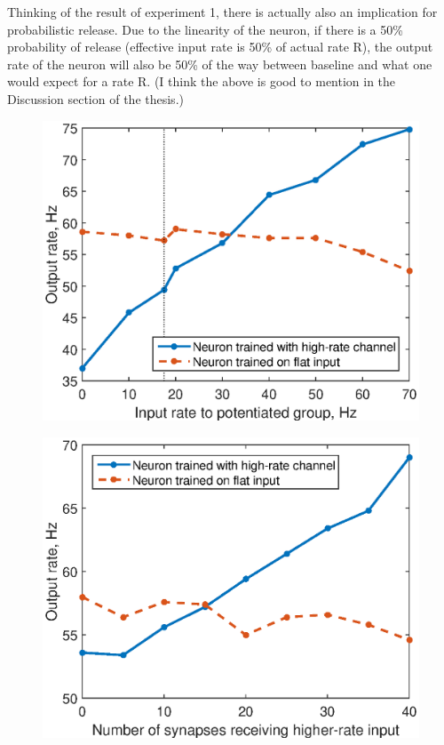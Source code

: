 \documentclass[a4paper,12pt]{report}
\theoremstyle{definition}
\begin{document}
Thinking of the result of experiment 1, there is actually also an implication for probabilistic release. Due to the linearity of the neuron, if there is a 50\% probability of release (effective input rate is 50\% of actual rate R), the output rate of the neuron will also be 50\% of the way between baseline and what one would expect for a rate R.
(I think the above is good to mention in the Discussion section of the thesis.)

\begin{figure}
\centering
\begin{minipage}{.5\textwidth}
  \centering
  \includegraphics[width=1\linewidth]{figures/exp1_filter.eps}
  \label{fig:test1}
\end{minipage}%
\begin{minipage}{.5\textwidth}
  \centering
  \includegraphics[width=1\linewidth]{figures/exp5_patterncompletion.eps}
  \label{fig:test2}
\end{minipage}
\end{figure}
\end{document}
